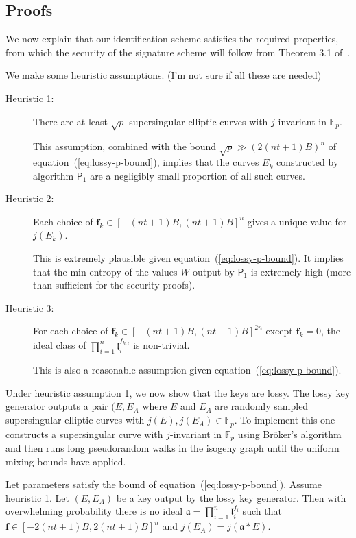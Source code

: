 \documentclass{llncs}
\newcommand{\F}{\mathbb{F}}
\renewcommand{\a}{\mathfrak{a}}
\renewcommand{\l}{\mathfrak{l}}
\newcommand{\f}{\textbf{f}}
\newcommand{\PP}{\textsf{P}}
\begin{document}
\subsection{Proofs}

We now explain that our identification scheme satisfies the required properties, from which the security of the signature scheme will follow from Theorem 3.1 of~\cite{KLS18}.

We make some heuristic assumptions.
(I'm not sure if all these are needed)
\begin{description}
\item[Heuristic 1:] There are at least $\sqrt{p}$ supersingular elliptic curves with $j$-invariant in $\F_p$.

This assumption, combined with the bound $\sqrt{p} \gg (2(nt+1)B)^n $ of equation~(\ref{eq:lossy-p-bound}), implies that the curves $E_k$ constructed by algorithm $\PP_1$ are a negligibly small proportion of all such curves.

\item[Heuristic 2:] Each choice of $\f_k \in [-(nt+1)B,(nt+1)B]^n$ gives a unique value for $j(E_k)$.

This is extremely plausible given equation~(\ref{eq:lossy-p-bound}). It implies that the min-entropy of the values $W$ output by $\PP_1$ is extremely high (more than sufficient for the security proofs).

\item[Heuristic 3:] For each choice of $\f_k \in [-(nt+1)B,(nt+1)B]^{2n}$ except $\f_k = 0$, the ideal class of $\prod_{i=1}^n \l_i^{f_{k,i}}$ is non-trivial.

This is also a reasonable assumption given equation~(\ref{eq:lossy-p-bound}).
\end{description}

Under heuristic assumption 1, we now show that the keys are lossy.
The lossy key generator outputs a pair $(E,E_A$ where $E$ and $E_A$ are randomly sampled supersingular elliptic curves with $j(E), j(E_A) \in \F_p$.
To implement this one constructs a supersingular curve with $j$-invariant in $\F_p$ using Br{\" o}ker's algorithm~\cite{Bro09} and then runs long pseudorandom walks in the isogeny graph until the uniform mixing bounds have applied.

\begin{lemma}\label{lem:isogeny count}
Let parameters satisfy the bound of equation~(\ref{eq:lossy-p-bound}). Assume heuristic 1. Let $(E,E_A)$ be a key output by the lossy key generator. Then with overwhelming probability there is no ideal $\a = \prod_{i=1}^n \l_i^{f_{i}}$ such that $\f \in [-2(nt+1)B,2(nt+1)B]^{n}$ and $j(E_A) = j( \a * E )$.
\end{lemma}
\end{document}
